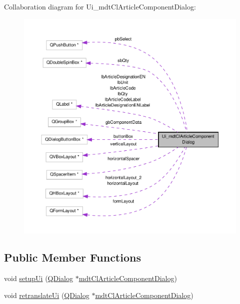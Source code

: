 Collaboration diagram for Ui\-\_\-mdt\-Cl\-Article\-Component\-Dialog\-:\nopagebreak
\begin{figure}[H]
\begin{center}
\leavevmode
\includegraphics[width=350pt]{class_ui__mdt_cl_article_component_dialog__coll__graph}
\end{center}
\end{figure}
\subsection*{Public Member Functions}
\begin{DoxyCompactItemize}
\item 
void \hyperlink{class_ui__mdt_cl_article_component_dialog_a7056d3e70d0c05bf520b93ea45b47077}{setup\-Ui} (\hyperlink{class_q_dialog}{Q\-Dialog} $\ast$\hyperlink{classmdt_cl_article_component_dialog}{mdt\-Cl\-Article\-Component\-Dialog})
\item 
void \hyperlink{class_ui__mdt_cl_article_component_dialog_a2cce20b6332d1e4d335208f611b381c6}{retranslate\-Ui} (\hyperlink{class_q_dialog}{Q\-Dialog} $\ast$\hyperlink{classmdt_cl_article_component_dialog}{mdt\-Cl\-Article\-Component\-Dialog})
\end{DoxyCompactItemize}
